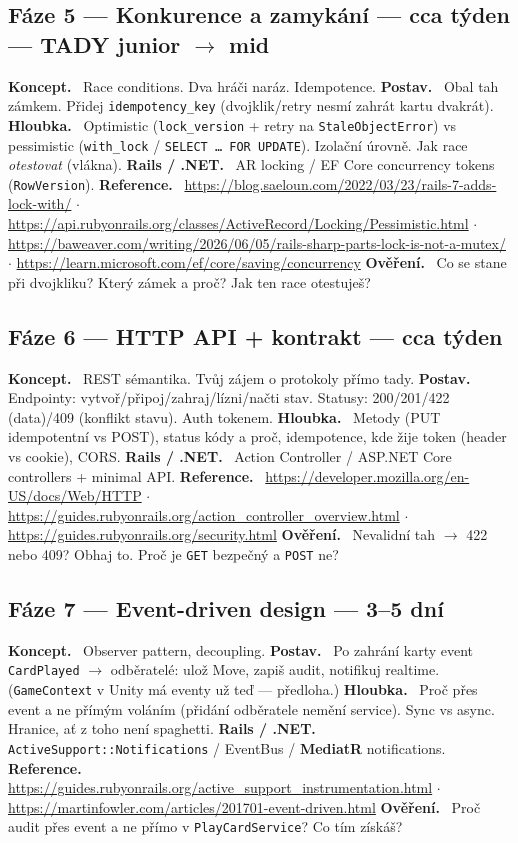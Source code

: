 \documentclass[11pt]{article}
\newcommand{\phase}[2]{\subsection{#1 \textnormal{\textcolor{soft}{\small— #2}}}}
\newcommand{\field}[1]{\textbf{#1.}\ }
\begin{document}
\phase{Fáze 5 — Konkurence a zamykání}{cca týden — TADY junior $\rightarrow$ mid}
\field{Koncept} Race conditions. Dva hráči naráz. Idempotence.
\field{Postav} Obal tah zámkem. Přidej \texttt{idempotency\_key} (dvojklik/retry nesmí zahrát kartu dvakrát).
\field{Hloubka} Optimistic (\texttt{lock\_version} + retry na \texttt{StaleObjectError}) vs pessimistic (\texttt{with\_lock} / \texttt{SELECT … FOR UPDATE}). Izolační úrovně. Jak race \emph{otestovat} (vlákna).
\field{Rails / .NET} AR locking / EF Core concurrency tokens (\texttt{RowVersion}).
\field{Reference} \url{https://blog.saeloun.com/2022/03/23/rails-7-adds-lock-with/} $\cdot$ \url{https://api.rubyonrails.org/classes/ActiveRecord/Locking/Pessimistic.html} $\cdot$ \url{https://baweaver.com/writing/2026/06/05/rails-sharp-parts-lock-is-not-a-mutex/} $\cdot$ \url{https://learn.microsoft.com/ef/core/saving/concurrency}
\field{Ověření} Co se stane při dvojkliku? Který zámek a proč? Jak ten race otestuješ?

\phase{Fáze 6 — HTTP API + kontrakt}{cca týden}
\field{Koncept} REST sémantika. Tvůj zájem o protokoly přímo tady.
\field{Postav} Endpointy: vytvoř/připoj/zahraj/lízni/načti stav. Statusy: 200/201/422 (data)/409 (konflikt stavu). Auth tokenem.
\field{Hloubka} Metody (PUT idempotentní vs POST), status kódy a proč, idempotence, kde žije token (header vs cookie), CORS.
\field{Rails / .NET} Action Controller / ASP.NET Core controllers + minimal API.
\field{Reference} \url{https://developer.mozilla.org/en-US/docs/Web/HTTP} $\cdot$ \url{https://guides.rubyonrails.org/action_controller_overview.html} $\cdot$ \url{https://guides.rubyonrails.org/security.html}
\field{Ověření} Nevalidní tah $\rightarrow$ 422 nebo 409? Obhaj to. Proč je \texttt{GET} bezpečný a \texttt{POST} ne?

\phase{Fáze 7 — Event-driven design}{3–5 dní}
\field{Koncept} Observer pattern, decoupling.
\field{Postav} Po zahrání karty event \texttt{CardPlayed} $\rightarrow$ odběratelé: ulož Move, zapiš audit, notifikuj realtime. (\texttt{GameContext} v Unity má eventy už teď — předloha.)
\field{Hloubka} Proč přes event a ne přímým voláním (přidání odběratele nemění service). Sync vs async. Hranice, ať z toho není spaghetti.
\field{Rails / .NET} \texttt{ActiveSupport::Notifications} / EventBus / \textbf{MediatR} notifications.
\field{Reference} \url{https://guides.rubyonrails.org/active_support_instrumentation.html} $\cdot$ \url{https://martinfowler.com/articles/201701-event-driven.html}
\field{Ověření} Proč audit přes event a ne přímo v \texttt{PlayCardService}? Co tím získáš?
\end{document}
